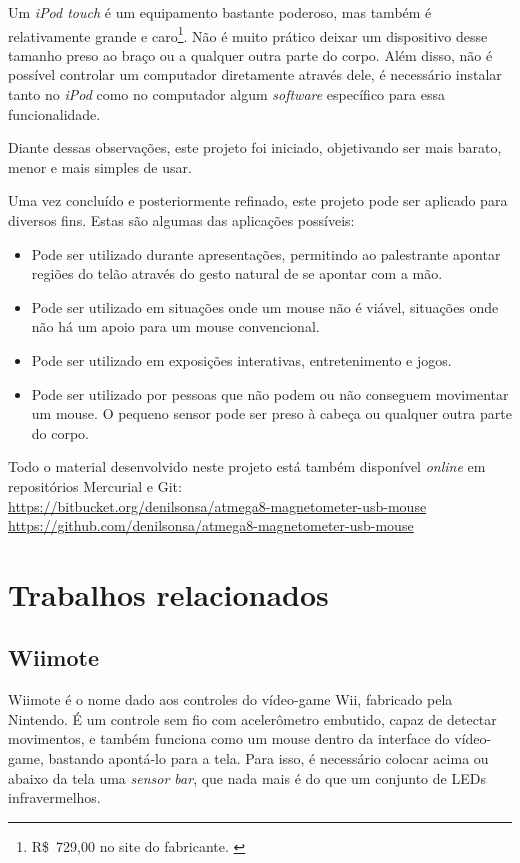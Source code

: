 \documentclass[brazil,pagestart=firstchapter]{abnt}
\begin{document}
Um \textit{iPod touch} é um equipamento bastante poderoso, mas também é
relativamente grande e caro\footnote{
	R\$~729,00 no site do fabricante. \cite{AppleStoreiPodTouch}
}. Não é muito prático deixar um dispositivo desse tamanho preso ao braço ou
a qualquer outra parte do corpo. Além disso, não é possível controlar um
computador diretamente através dele, é necessário instalar tanto no
\textit{iPod} como no computador algum \textit{software} específico para
essa funcionalidade.

Diante dessas observações, este projeto foi iniciado, objetivando ser mais
barato, menor e mais simples de usar.

Uma vez concluído e posteriormente refinado, este projeto pode ser aplicado
para diversos fins. Estas são algumas das aplicações possíveis:

\begin{itemize}
\item Pode ser utilizado durante apresentações, permitindo ao palestrante
apontar regiões do telão através do gesto natural de se apontar com a mão.
\item Pode ser utilizado em situações onde um mouse não é viável, situações
onde não há um apoio para um mouse convencional.
\item Pode ser utilizado em exposições interativas, entretenimento e jogos.
\item Pode ser utilizado por pessoas que não podem ou não conseguem
movimentar um mouse. O pequeno sensor pode ser preso à cabeça ou qualquer
outra parte do corpo.
\end{itemize}

Todo o material desenvolvido neste projeto está também disponível
\textit{online} em repositórios Mercurial e Git: \\
\url{https://bitbucket.org/denilsonsa/atmega8-magnetometer-usb-mouse} \\
\url{https://github.com/denilsonsa/atmega8-magnetometer-usb-mouse}


\section{Trabalhos relacionados}
\label{sec:trabalhos_relacionados}


\subsection{Wiimote}
\label{sub:wiimote}

Wiimote é o nome dado aos controles do vídeo-game Wii, fabricado pela
Nintendo. É um controle sem fio com acelerômetro embutido, capaz de detectar
movimentos, e também funciona como um mouse dentro da interface do
vídeo-game, bastando apontá-lo para a tela. Para isso, é necessário colocar
acima ou abaixo da tela uma \textit{sensor bar}, que nada mais é do que um
conjunto de \acsp{LED} infravermelhos. \cite{WikipediaWiimote}
\end{document}
